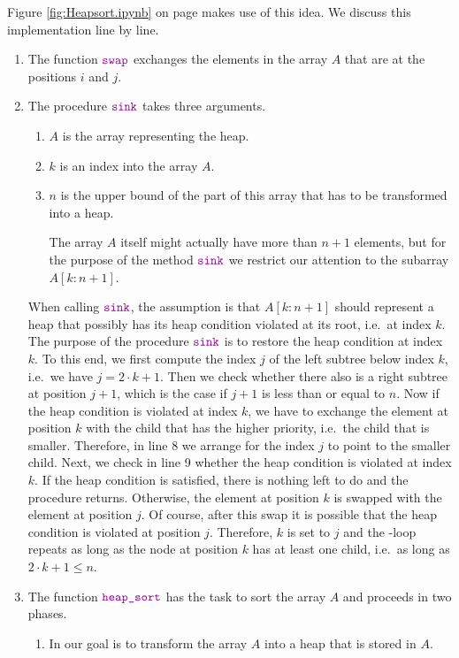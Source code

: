 Figure \ref{fig:Heapsort.ipynb} on page \pageref{fig:Heapsort.ipynb} makes use of this idea.
We discuss this implementation line by line.
\begin{enumerate}
\item The function $\mytt{swap}$ exchanges the elements in the array ${A}$ that are at the
      positions $i$ and $j$.
\item The procedure $\mytt{sink}$ takes three arguments.
      \begin{enumerate}
      \item ${A}$ is the array representing the heap.
      \item ${k}$ is an index into the array ${A}$.
      \item ${n}$ is the upper bound  of the part of this array that has to be transformed into a heap.  

            The array ${A}$ itself might actually have more than $n+1$ elements, but for the
            purpose of the method $\mytt{sink}$ we restrict our attention to the subarray
            ${A[k:n+1]}$. 
      \end{enumerate}
      When calling $\mytt{sink}$, the assumption is that $A[{k:n+1}]$ should represent a heap 
      that possibly has its heap condition violated at its root, i.e.~at index ${k}$.  The
      purpose of the procedure $\mytt{sink}$ is to restore the heap condition at index ${k}$.
      To this end, we first compute the index ${j}$ of the left subtree below index ${k}$,
      i.e.~we have $j = 2 \cdot k + 1$.
      Then we check whether there also is a right subtree at position ${j}+1$, which is the
      case if $j + 1$ is less than or equal to  ${n}$.  Now if the heap condition is violated at index
      ${k}$, we have to exchange the element at  position ${k}$ with the child that has
      the higher priority, i.e.~the child that is smaller. Therefore, in line 8 we arrange for the index
      ${j}$ to point to the smaller child.  Next, we check in line 9 whether the heap
      condition is violated at index ${k}$.  If the heap condition is satisfied, there is
      nothing left to do and the procedure returns.  Otherwise, the element at position ${k}$ is swapped with
      the element at position ${j}$.  Of course, after this swap it is possible that the heap condition is
      violated at position ${j}$.  Therefore,  ${k}$ is set to ${j}$ and the -loop repeats
      as long as the node at position ${k}$ has at least one child, i.e.~as long as 
      $2 \cdot {k} + 1 \leq {n}$.
\item The function $\mytt{heap\_sort}$ has the task to sort the array ${A}$ and proceeds in two phases.
      \begin{enumerate}
      \item In  our goal is to transform the array ${A}$ into a heap that is stored in ${A}$.


\end{enumerate}
\end{enumerate}
